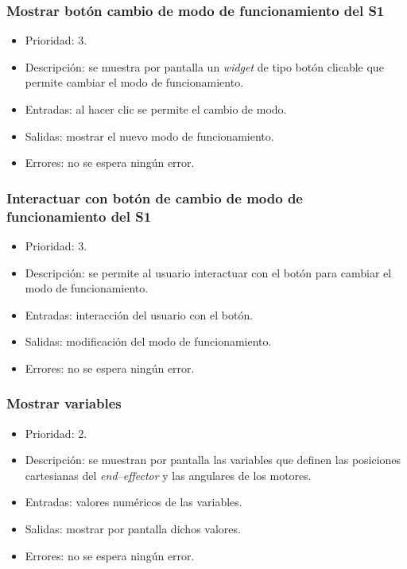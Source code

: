 \subsubsection{Mostrar botón cambio de modo de funcionamiento del \ac{S1}}
\begin{itemize}
    \item Prioridad: 3.
    \item Descripción: se muestra por pantalla un \textit{widget} de tipo botón clicable que permite cambiar el modo de funcionamiento. 
    \item Entradas: al hacer clic se permite el cambio de modo.
    \item Salidas: mostrar el nuevo modo de funcionamiento.
    \item Errores: no se espera ningún error.
\end{itemize}

\subsubsection{Interactuar con botón de cambio de modo de funcionamiento del \ac{S1}}
\begin{itemize}
    \item Prioridad: 3.
    \item Descripción: se permite al usuario interactuar con el botón para cambiar el modo de funcionamiento.
    \item Entradas: interacción del usuario con el botón.
    \item Salidas: modificación del modo de funcionamiento.
    \item Errores: no se espera ningún error.
\end{itemize}

\subsubsection{Mostrar variables}
\begin{itemize}
    \item Prioridad: 2.
    \item Descripción: se muestran por pantalla las variables que definen las posiciones cartesianas del \textit{end--effector} y las angulares de los motores.
    \item Entradas: valores numéricos de las variables.
    \item Salidas: mostrar por pantalla dichos valores.
    \item Errores: no se espera ningún error.
\end{itemize}

